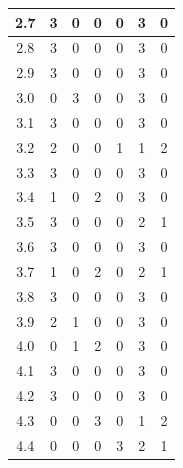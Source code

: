 \documentclass[11pt]{jreport}
\begin{document}
\begin{table}[H]
{\begin{tabular}{c|c|c|c|c|c|c}
    2.7 & 3 & 0 & 0 & 0 & 3 & 0 \\
    \hline
    2.8 & 3 & 0 & 0 & 0 & 3 & 0 \\
    \hline
    2.9 & 3 & 0 & 0 & 0 & 3 & 0 \\
    \hline
    3.0 & 0 & 3 & 0 & 0 & 3 & 0 \\
    \hline
    3.1 & 3 & 0 & 0 & 0 & 3 & 0 \\
    \hline
    3.2& 2 & 0 & 0 & 1 & 1 & 2 \\
    \hline
    3.3 & 3 & 0 & 0 & 0 & 3 & 0 \\
    \hline
    3.4 & 1 & 0 & 2 & 0 & 3 & 0 \\
    \hline
    3.5 & 3 & 0 & 0 & 0 & 2 & 1 \\
    \hline
    3.6 & 3 & 0 & 0 & 0 & 3 & 0 \\
    \hline
    3.7 & 1 & 0 & 2 & 0 & 2 & 1 \\
    \hline
    3.8 & 3 & 0 & 0 & 0 & 3 & 0 \\
    \hline
    3.9 & 2 & 1 & 0 & 0 & 3 & 0 \\
    \hline
    4.0 & 0 & 1 & 2 & 0 & 3 & 0 \\
    \hline
    4.1 & 3 & 0 & 0 & 0 & 3 & 0 \\
    \hline
    4.2 & 3 & 0 & 0 & 0 & 3 & 0 \\
    \hline
    4.3 & 0 & 0 & 3 & 0 & 1 & 2 \\
    \hline
    4.4 & 0 & 0 & 0 & 3 & 2 & 1 \\
    \hline
    \end{tabular}
    }
\end{table}
\end{document}
